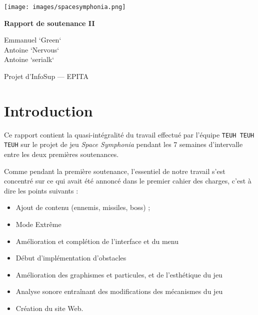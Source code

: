 \documentclass[12pt,a4paper]{article}
\title{}
\author{}
\date{}
\newcommand{\subtitle}{Rapport de soutenance II}
\begin{document}
	\begin{titlepage}
	\begin{center}
	\vspace{8cm}
	\texttt{[image: images/spacesymphonia.png]}

	\vspace{0.5cm}
	\LARGE{\textbf{\subtitle}}

	\vspace{1cm}
	\large{\textsf{
	Emmanuel `Green`  \\
	Antoine `Nervous`  \\
	Antoine `serialk` }}

	\vspace{2cm}

	\large{\textsf{Projet d'InfoSup --- EPITA}}

	\end{center}
	\end{titlepage}

	\setcounter{tocdepth}{3}
	\tableofcontents
	\newpage
	\pagestyle{headings}

	\section{Introduction}
		\par
		Ce rapport contient la quasi-intégralité du travail effectué par l'équipe \texttt{TEUH TEUH TEUH} sur le projet de jeu \emph{Space Symphonia} pendant les 7 semaines d'intervalle entre les deux premières soutenances. \\
		\par
		Comme pendant la première soutenance, l'essentiel de notre travail s'est concentré sur ce qui avait été annoncé dans le premier cahier des charges, c'est à dire les points suivants : \\
		\par
		\begin{itemize}
		\item Ajout de contenu (ennemis, missiles, boss) ;
		\item Mode Extrême
		\item Amélioration et complétion de l'interface et du menu
		\item Début d'implémentation d'obstacles
		\item Amélioration des graphismes et particules, et de l'esthétique du jeu
		\item Analyse sonore entraînant des modifications des mécanismes du jeu
		\item Création du site Web.
		\end{itemize}
		\newpage
\end{document}
